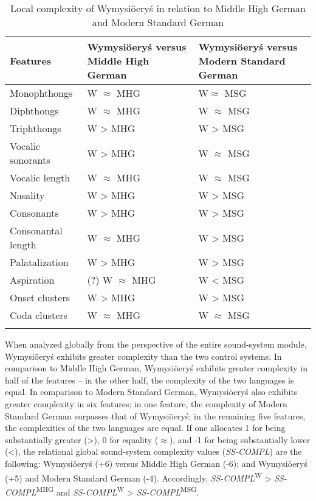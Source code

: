 \documentclass[output=paper,hidelinks]{langscibook}
\begin{document}
\begin{table}
\caption{Local complexity of Wymysiöeryś in relation to Middle High German and Modern Standard German}
\label{tab:Wymysiöeryś:1}
\begin{tabularx}{\textwidth}{lQQ}

\lsptoprule

Features & Wymysiöeryś versus Middle High German & Wymysiöeryś versus Modern Standard German\\
\midrule
Monophthongs & W ${\approx}$ MHG & W${\approx}$ MSG\\
Diphthongs & W ${\approx}$ MHG & W ${\approx}$ MSG\\
Triphthongs & W > MHG & W > MSG\\
Vocalic sonorants & W > MHG & W ${\approx}$ MSG\\
Vocalic length & W ${\approx}$ MHG & W ${\approx}$ MSG\\
Nasality & W > MHG & W > MSG\\
Consonants & W > MHG & W > MSG\\
Consonantal length & W ${\approx}$ MHG & W > MSG\\
Palatalization & W > MHG & W > MSG\\
Aspiration & (?) W ${\approx}$ MHG & W < MSG\\
Onset clusters & W > MHG & W > MSG\\
Coda clusters & W ${\approx}$ MHG & W ${\approx}$ MSG\\
\lspbottomrule
\end{tabularx}
\end{table}

When analyzed globally from the perspective of the entire sound-system module, Wymysiöeryś exhibits greater complexity than the two control systems. In comparison to Middle High German, Wymysiöeryś exhibits greater complexity in half of the features – in the other half, the complexity of the two languages is equal. In comparison to Modern Standard German, Wymysiöeryś also exhibits greater complexity in six features; in one feature, the complexity of Modern Standard German surpasses that of Wymysiöeryś; in the remaining five features, the complexities of the two languages are equal. If one allocates 1 for being substantially greater (>), 0 for equality (${\approx}$), and -1 for being substantially lower (<), the relational global sound-system complexity values (\textit{SS-COMPL}) are the following: Wymysiöeryś (+6) versus Middle High German (-6); and Wymysiöeryś (+5) and Modern Standard German (-4). Accordingly, \textit{SS-COMPL}\textsuperscript{W} > \textit{SS-COMPL}\textsuperscript{MHG} and \textit{SS-COMPL}\textsuperscript{W} > \textit{SS-COMPL}\textsuperscript{MSG}. 
\end{document}
